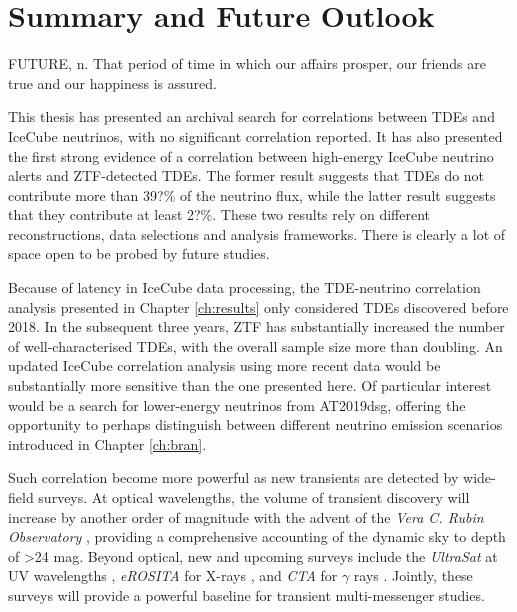 \setchapterpreamble[u]{\margintoc}
\chapter{Summary and Future Outlook}
\begin{fquote} FUTURE, n. That period of time in which our affairs prosper, our friends are true and our happiness is assured.  
\end{fquote}

This thesis has presented an archival search for correlations between TDEs and IceCube neutrinos, with no significant correlation reported. It has also presented the first strong evidence of a correlation between high-energy IceCube neutrino alerts and ZTF-detected TDEs. The former result suggests that TDEs do not contribute more than 39?\% of the neutrino flux, while the latter result suggests that they contribute at least 2?\%. These two results rely on different reconstructions, data selections and analysis frameworks. There is clearly a lot of space open to be probed by future studies.

Because of latency in IceCube data processing, the TDE-neutrino correlation analysis presented in Chapter \ref{ch:results} only considered TDEs discovered before 2018. In the subsequent three years, ZTF has substantially increased the number of well-characterised TDEs, with the overall sample size more than doubling. An updated IceCube correlation analysis using more recent data would be substantially more sensitive than the one presented here. Of particular interest would be a search for lower-energy neutrinos from AT2019dsg, offering the opportunity to perhaps distinguish between different neutrino emission scenarios introduced in Chapter \ref{ch:bran}.  

Such correlation become more powerful as new transients are detected by wide-field surveys. At optical wavelengths, the volume of transient discovery will increase by another order of magnitude with the advent of the \emph{Vera C. Rubin Observatory} , providing a comprehensive accounting of the dynamic sky to depth of >24 mag. Beyond optical, new and upcoming surveys include the \emph{UltraSat} at UV wavelengths , \emph{eROSITA} for X-rays , and \emph{CTA} for $\gamma$ rays . Jointly, these surveys will provide a powerful baseline for transient multi-messenger studies.

